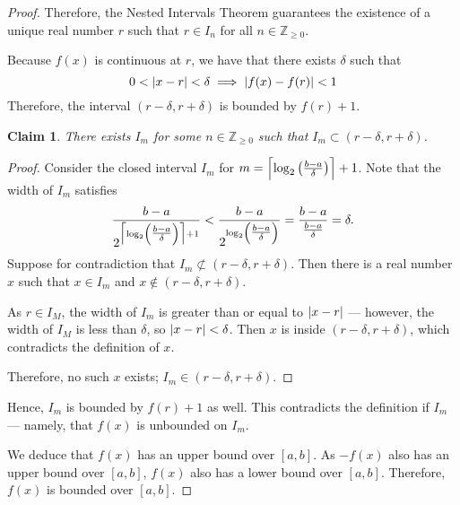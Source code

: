 \documentclass[11pt]{article}
\newtheorem*{claim*}{Claim}
\begin{document}
\begin{proof}
Therefore, the Nested Intervals Theorem guarantees the existence of a unique real number $r$ such that $r \in I_{n}$ for all $n \in \mathbb{Z}_{\ge 0}$. 

Because $f(x)$ is continuous at $r$, we have that there exists $\delta$ such that 
\[  
0 < |x - r | < \delta \implies \abs{f(x) - f(r)} < 1
\]
Therefore, the interval $(r - \delta, r + \delta)$ is bounded by $f(r) + 1$.

\begin{adjustwidth}{1cm}{}
    \begin{claim*}
    	There exists $I_m$ for some $n \in \mathbb{Z}_{\ge 0}$ such that $I_m \subset (r - \delta, r+ \delta)$.
    \end{claim*}
    \begin{proof}\renewcommand{\qedsymbol}{} 
		Consider the closed interval $I_m$ for $m = \Bigl\lceil \log_2 \left( \tfrac{b-a}{\delta} \right) \Bigr\rceil + 1$. Note that the width of $I_m$ satisfies 
		\[
			\frac{b-a}{2^{\Bigl\lceil \log_2 \left( \tfrac{b-a}{\delta} \right) \Bigr\rceil + 1}} < \frac{b-a}{2^{\log_2 \left( \tfrac{b-a}{\delta} \right) }} = \frac{b-a}{\tfrac{b-a}{\delta}} = \delta.
		\]
		Suppose for contradiction that $I_m \not\subset (r - \delta, r + \delta)$. Then there is a real number $x$  such that $x \in I_m$ and $x \not\in (r - \delta, r + \delta)$.

		As $r \in I_M$, the width of $I_m$ is greater than or equal to $\abs{x - r}$ --- however, the width of $I_M$ is less than $\delta$, so $\abs{x - r} < \delta$. Then $x$ is inside $(r - \delta, r + \delta)$, which contradicts the definition of $x$.
		
		Therefore, no such $x$ exists; $I_m \in (r - \delta, r + \delta)$.
	\end{proof}
\end{adjustwidth}

Hence, $I_m$ is bounded by $f(r) + 1$ as well. This contradicts the definition if $I_m$ --- namely, that $f(x)$ is unbounded on $I_m$.

We deduce that $f(x)$ has an upper bound over $[a, b]$. As $-f(x)$ also has an upper bound over $[a, b]$, $f(x)$ also has a lower bound over $[a, b]$. Therefore, $f(x)$ is bounded over $[a, b]$.

\end{proof}

\end{document}
